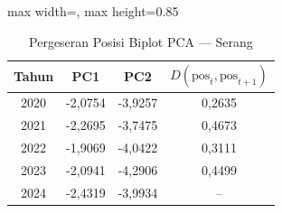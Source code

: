 \begin{table}[H]
\centering
\caption{Pergeseran Posisi Biplot PCA --- Serang} \label{tab:appjarak_pca_skor_serang}
\begin{adjustbox}{max width=\textwidth, max height=0.85\textheight}
\begin{tabular}{|c|c|c|c|}
\hline
\textbf{Tahun} & \textbf{PC1} & \textbf{PC2} & \textbf{$D(\text{pos}_t, \text{pos}_{t+1})$} \\
\hline
2020 & -2,0754 & -3,9257 & 0,2635 \\
2021 & -2,2695 & -3,7475 & 0,4673 \\
2022 & -1,9069 & -4,0422 & 0,3111 \\
2023 & -2,0941 & -4,2906 & 0,4499 \\
2024 & -2,4319 & -3,9934 & -- \\
\hline
\end{tabular}
\end{adjustbox}
\end{table}